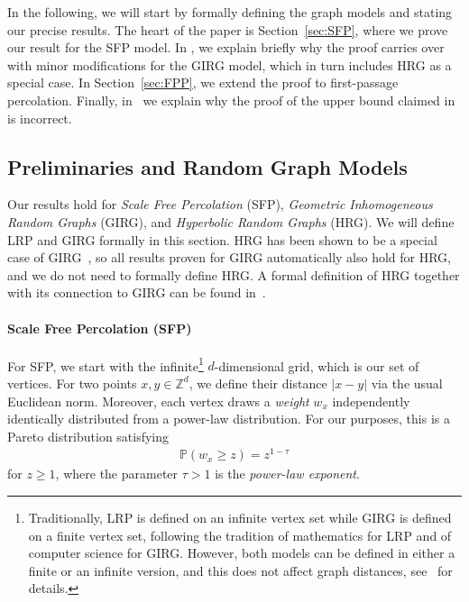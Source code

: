 \documentclass[11pt, letterpaper, margin=1in]{amsart}
\theoremstyle{definition}
\theoremstyle{remark}
\renewcommand{\Pr}[1]{\ensuremath{\mathbb{P} \left(#1 \right) }}
\newcommand{\W}[1]{\ensuremath{ w_{ #1 } }}
\numberwithin{equation}{section}
\begin{document}
In the following, we will start by formally defining the graph models and stating our precise results. The heart of the paper is Section~\ref{sec:SFP}, where we prove our result for the SFP model. In , we explain briefly why the proof carries over with minor modifications for the GIRG model, which in turn includes HRG as a special case. In Section~\ref{sec:FPP}, we extend the proof to first-passage percolation. Finally, in~ we explain why the proof of the upper bound claimed in~\cite{hao2023graph} is incorrect.

\subsection{Preliminaries and Random Graph Models}\label{sec:models}
Our results hold for \emph{Scale Free Percolation} (SFP), \emph{Geometric Inhomogeneous Random Graphs} (GIRG), and \emph{Hyperbolic Random Graphs} (HRG). We will define LRP and GIRG formally in this section. HRG has been shown to be a special case of GIRG~\cite{bringmann2019geometric}, so all results proven for GIRG automatically also hold for HRG, and we do not need to formally define HRG. A formal definition of HRG together with its connection to GIRG can be found in~\cite{bringmann2019geometric}. 

\medskip\paragraph{\textbf{Scale Free Percolation (SFP)}} For SFP, we start with the infinite\footnote{Traditionally, LRP is defined on an infinite vertex set while GIRG is defined on a finite vertex set, following the tradition of mathematics for LRP and of computer science for GIRG. However, both models can be defined in either a finite or an infinite version, and this does not affect graph distances, see~\cite{komjathy2020explosion} for details.} $d$-dimensional grid, which is our set of vertices. For two points $x, y \in \mathbb{Z}^d$, we define their distance $|x - y|$ via the usual Euclidean norm. Moreover, each vertex draws a \emph{weight} $\W{x}$ independently identically distributed from a power-law distribution. For our purposes, this is a Pareto distribution satisfying
\begin{align*}
    \Pr{\W{x} \ge z} = z^{1-\tau}
\end{align*} for $z \ge 1$, where the parameter $\tau > 1$ is the \emph{power-law exponent}.
\end{document}

